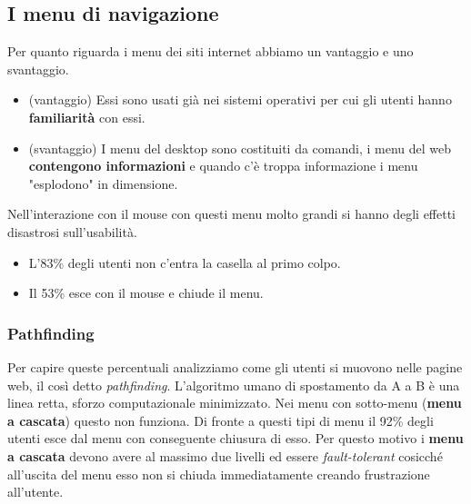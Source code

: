 		\subsection{I menu di navigazione}
			Per quanto riguarda i menu dei siti internet abbiamo un vantaggio e uno svantaggio.
			\begin{itemize}
				\item (vantaggio) Essi sono usati già nei sistemi operativi per cui gli utenti hanno \textbf{familiarità} con essi.
				\item (svantaggio) I menu del desktop sono costituiti da comandi, i menu del web \textbf{contengono informazioni} e quando c'è troppa informazione i menu "esplodono" in dimensione.
			\end{itemize}
			Nell'interazione con il mouse con questi menu molto grandi si hanno degli effetti disastrosi sull'usabilità.
			\begin{itemize}
				\item L'83\% degli utenti non c'entra la casella al primo colpo.
				\item Il 53\% esce con il mouse e chiude il menu.
			\end{itemize}

			\subsubsection{Pathfinding}
				Per capire queste percentuali analizziamo come gli utenti si muovono nelle pagine web, il così detto \emph{pathfinding}. L'algoritmo umano di spostamento da A a B è una linea retta, sforzo computazionale minimizzato. Nei menu con sotto-menu (\textbf{menu a cascata}) questo non funziona. Di fronte a questi tipi di menu il 92\% degli utenti esce dal menu con conseguente chiusura di esso. Per questo motivo i \textbf{menu a cascata} devono avere al massimo due livelli ed essere \emph{fault-tolerant} cosicché all'uscita del menu esso non si chiuda immediatamente creando frustrazione all'utente.
			
